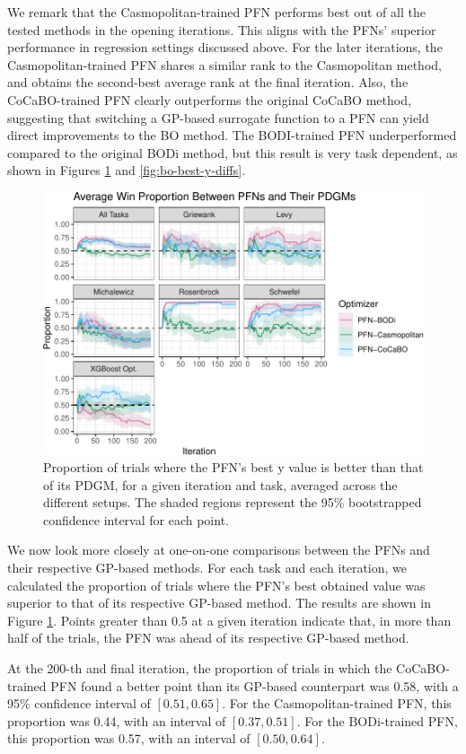\documentclass[12pt,twoside]{reedthesis}
\begin{document}
We remark that the Casmopolitan-trained PFN performs best out of all the tested methods in the opening iterations. This aligns with the PFNs' superior performance in regression settings discussed above. For the later iterations, the Casmopolitan-trained PFN shares a similar rank to the Casmopolitan method, and obtains the second-best average rank at the final iteration. Also, the CoCaBO-trained PFN clearly outperforms the original CoCaBO method, suggesting that switching a GP-based surrogate function to a PFN can yield direct improvements to the BO method. The BODI-trained PFN underperformed compared to the original BODi method, but this result is very task dependent, as shown in Figures \ref{fig:bo-1v1} and \ref{fig:bo-best-y-diffs}.
\begin{figure}
\centering
\includegraphics{thesis_files/figure-latex/bo-1v1-1.pdf}
\caption{\label{fig:bo-1v1}Proportion of trials where the PFN's best y value is better than that of its PDGM, for a given iteration and task, averaged across the different setups. The shaded regions represent the 95\% bootstrapped confidence interval for each point.}
\end{figure}
We now look more closely at one-on-one comparisons between the PFNs and their respective GP-based methods. For each task and each iteration, we calculated the proportion of trials where the PFN's best obtained value was superior to that of its respective GP-based method. The results are shown in Figure \ref{fig:bo-1v1}. Points greater than 0.5 at a given iteration indicate that, in more than half of the trials, the PFN was ahead of its respective GP-based method.

At the 200-th and final iteration, the proportion of trials in which the CoCaBO-trained PFN found a better point than its GP-based counterpart was 0.58, with a 95\% confidence interval of \([0.51, 0.65]\). For the Casmopolitan-trained PFN, this proportion was 0.44, with an interval of \([0.37, 0.51]\). For the BODi-trained PFN, this proportion was 0.57, with an interval of \([0.50, 0.64]\).
\end{document}

